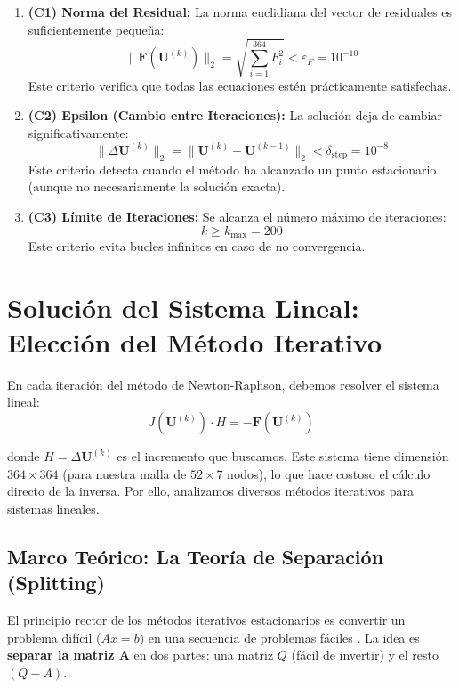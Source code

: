 \documentclass[11pt,letterpaper]{article}
\begin{document}
\begin{enumerate}
    \item \textbf{(C1) Norma del Residual:} La norma euclidiana del vector de residuales es suficientemente pequeña:
    \[
    \|\mathbf{F}(\mathbf{U}^{(k)})\|_2 = \sqrt{\sum_{i=1}^{364} F_i^2} < \varepsilon_F = 10^{-10}
    \]
    Este criterio verifica que todas las ecuaciones estén prácticamente satisfechas.
    
    \item \textbf{(C2) Epsilon (Cambio entre Iteraciones):} La solución deja de cambiar significativamente:
    \[
    \|\Delta\mathbf{U}^{(k)}\|_2 = \|\mathbf{U}^{(k)} - \mathbf{U}^{(k-1)}\|_2 < \delta_{\text{step}} = 10^{-8}
    \]
    Este criterio detecta cuando el método ha alcanzado un punto estacionario (aunque no necesariamente la solución exacta).
    
    \item \textbf{(C3) Límite de Iteraciones:} Se alcanza el número máximo de iteraciones:
    \[
    k \geq k_{\max} = 200
    \]
    Este criterio evita bucles infinitos en caso de no convergencia.
\end{enumerate}


\newpage
\section{Solución del Sistema Lineal: Elección del Método Iterativo}

En cada iteración del método de Newton-Raphson, debemos resolver el sistema lineal:
\[
J(\mathbf{U}^{(k)}) \cdot H = -\mathbf{F}(\mathbf{U}^{(k)})
\]

donde $H = \Delta\mathbf{U}^{(k)}$ es el incremento que buscamos. Este sistema tiene dimensión $364 \times 364$ (para nuestra malla de $52 \times 7$ nodos), lo que hace costoso el cálculo directo de la inversa. Por ello, analizamos diversos métodos iterativos para sistemas lineales.

\subsection{Marco Teórico: La Teoría de Separación (Splitting)}

El principio rector de los métodos iterativos estacionarios es convertir un problema difícil ($Ax = b$) en una secuencia de problemas fáciles \cite{Kincaid}. La idea es \textbf{separar la matriz A} en dos partes: una matriz $Q$ (fácil de invertir) y el resto $(Q - A)$.
\end{document}
